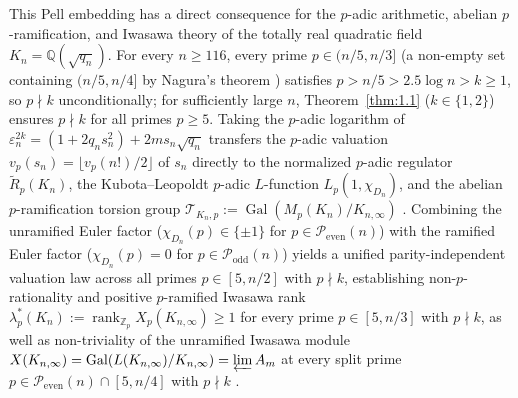 \documentclass[11pt,reqno]{amsart}
\theoremstyle{remark}
\numberwithin{equation}{section}
\newcommand{\Z}{\mathbb{Z}}
\newcommand{\Q}{\mathbb{Q}}
\newcommand{\Podd}{\mathcal{P}_{\mathrm{odd}}}
\newcommand{\Peven}{\mathcal{P}_{\mathrm{even}}}
\DeclareMathOperator{\Gal}{Gal}
\DeclareMathOperator{\rank}{rank}
\begin{document}
This Pell embedding has a direct consequence for the $p$-adic arithmetic, abelian $p$-ramification, and Iwasawa theory of the totally real quadratic field $K_n = \Q(\sqrt{q_n})$. For every $n \ge 116$, every prime $p \in (n/5, n/3]$ (a non-empty set containing $(n/5, n/4]$ by Nagura's theorem \cite{Nagura1952}) satisfies $p > n/5 > 2.5\log n > k \ge 1$, so $p \nmid k$ unconditionally; for sufficiently large $n$, Theorem~\ref{thm:1.1} ($k \in \{1, 2\}$) ensures $p \nmid k$ for all primes $p \ge 5$. Taking the $p$-adic logarithm of $\varepsilon_n^{2k} = (1 + 2q_n s_n^2) + 2ms_n\sqrt{q_n}$ transfers the $p$-adic valuation $v_p(s_n) = \lfloor v_p(n!)/2 \rfloor$ of $s_n$ directly to the normalized $p$-adic regulator $\widetilde{R}_p(K_n)$, the Kubota--Leopoldt $p$-adic $L$-function $L_p(1, \chi_{D_n})$, and the abelian $p$-ramification torsion group $\mathcal{T}_{K_n, p} := \Gal(M_p(K_n)/K_{n,\infty})$ \cite{Coates1977,Gras2016,Taya1996}. Combining the unramified Euler factor ($\chi_{D_n}(p) \in \{\pm 1\}$ for $p \in \Peven(n)$) with the ramified Euler factor ($\chi_{D_n}(p) = 0$ for $p \in \Podd(n)$) yields a unified parity-independent valuation law across all primes $p \in [5, n/2]$ with $p \nmid k$, establishing non-$p$-rationality and positive $p$-ramified Iwasawa rank $\lambda_p^*(K_n) := \rank_{\Z_p} X_p(K_{n,\infty}) \ge 1$ for every prime $p \in [5, n/3]$ with $p \nmid k$, as well as non-triviality of the unramified Iwasawa module $X(K_{n,\infty}) = \Gal(L(K_{n,\infty})/K_{n,\infty}) = \varprojlim A_m$ at every split prime $p \in \Peven(n) \cap [5, n/4]$ with $p \nmid k$ \cite{FukudaKomatsu1986,Jaulent2024,Ozaki1997,Taya1996,Yanagisawa2026}.
\end{document}
